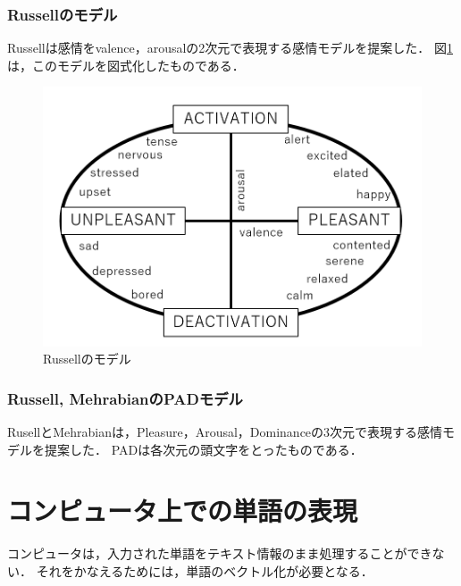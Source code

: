 		\subsubsection{Russellのモデル}
			Russell\cite{russell_2D}は感情をvalence，arousalの2次元で表現する感情モデルを提案した．
			図\ref{fig:russel_2D}は，このモデルを図式化したものである．
			\begin{figure}[H]
				\centering
				\includegraphics[width=\linewidth]{./figure/russell.png}
				\caption{Russellのモデル}
				\label{fig:russel_2D}
			\end{figure}

		\subsubsection{Russell, MehrabianのPADモデル}
			RusellとMehrabian\cite{russell_3D}は，Pleasure，Arousal，Dominanceの3次元で表現する感情モデルを提案した．
			PADは各次元の頭文字をとったものである．

\section{コンピュータ上での単語の表現}
	コンピュータは，入力された単語をテキスト情報のまま処理することができない．
	それをかなえるためには，単語のベクトル化が必要となる．

